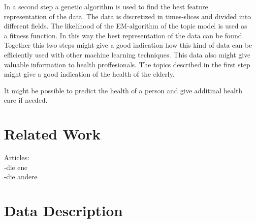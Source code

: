 \documentclass[11pt,a4paper]{article}
\begin{document}

In a second step a genetic algorithm is used to find the best feature representation of the data. The data is discretized in times-slices and divided into different fields. The likelihood of the EM-algorithm of the topic model is used as a fitness function. In this way the best representation of the data can be found.\\ %
Together this two steps might give a good indication how this kind of data can be efficiently used with other machine learning techniques.
This data also might give valuable information to health proffesionals. The topics described in the first step might give a good indication of the health of the elderly.

It might be possible to predict the health of a person and give additinal health care if needed.


\section{Related Work}
Articles:\\
-die ene\\
-die andere


\section{Data Description}
\end{document}

